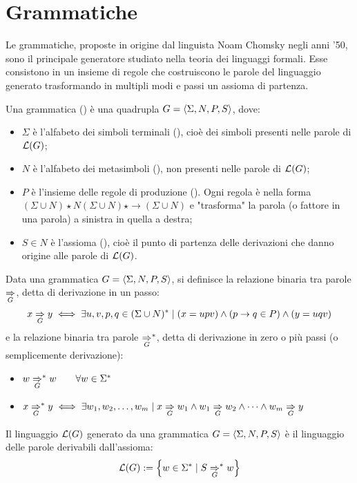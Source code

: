 \section{Grammatiche}
Le grammatiche, proposte in origine dal linguista Noam Chomsky negli anni '50, sono il principale generatore studiato nella teoria dei linguaggi formali. Esse consistono in un insieme di regole che costruiscono le parole del linguaggio generato trasformando in multipli modi e passi un assioma di partenza.
\begin{defin}[grammatica]
	Una grammatica () è una quadrupla $G=\langle \Sigma,N,P,S \rangle$, dove:
	\begin{itemize}
		\item $\Sigma$ è l'alfabeto dei simboli terminali (), cioè dei simboli presenti nelle parole di $\mathcal L(G)$;
		\item $N$ è l'alfabeto dei metasimboli (), non presenti nelle parole di $\mathcal L(G)$;
		\item $P$ è l'insieme delle regole di produzione (). Ogni regola è nella forma $(\Sigma\cup N)\star N(\Sigma\cup N)\star\to(\Sigma\cup N)$ e "trasforma" la parola (o fattore in una parola) a sinistra in quella a destra;
		\item $S\in N$ è l'assioma (), cioè il punto di partenza delle derivazioni che danno origine alle parole di $\mathcal L(G)$.
	\end{itemize}
	Data una grammatica $G=\langle \Sigma,N,P,S \rangle$, si definisce la relazione binaria tra parole $\underset{G}{\Rightarrow}$, detta di derivazione in un passo:
	\begin{equation*}
		x\underset{G}{\Rightarrow} y \iff \exists u,v,p,q\in(\Sigma\cup N)^* \mid (x=upv)\land(p\to q\in P)\land(y=uqv)
	\end{equation*}
	e la relazione binaria tra parole $\underset{G}{\Rightarrow}^*$, detta di derivazione in zero o più passi (o semplicemente derivazione):
	\begin{itemize}
		\item $w \underset{G}{\Rightarrow}^* w \qquad\forall w\in\Sigma^*$
		\item $x \underset{G}{\Rightarrow}^* y \iff \exists w_1,w_2,\dots,w_m \mid x\underset{G}{\Rightarrow} w_1 \land w_1\underset{G}{\Rightarrow} w_2 \land\dots\land w_m\underset{G}{\Rightarrow}y$
	\end{itemize}
	Il linguaggio $\mathcal L(G)$ generato da una grammatica $G=\langle \Sigma,N,P,S \rangle$ è il linguaggio delle parole derivabili dall'assioma:
	\begin{equation*}
		\mathcal L(G) := \left\{ w\in\Sigma^*\mid S\underset{G}{\Rightarrow}^* w \right\}
	\end{equation*}
\end{defin}


